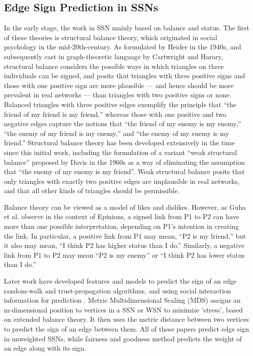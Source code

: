 \documentclass{article}
\begin{document}
\subsection{Edge Sign Prediction in SSNs}
In the early stage, the work in
SSN mainly based on balance and status. The first of these 
theories is structural balance theory, which originated in 
social psychology in the mid-20th-century. As formulated by 
Heider in the 1940s\cite{heider1940}, and subsequently cast 
in graph-theoretic language by Cartwright and 
Harary\cite{Cartwright1956-CARSBA-4}, structural balance 
considers the possible ways in which triangles on three 
individuals can be signed, and posits that triangles with 
three positive signs and those with one positive sign are 
more plausible — and hence should be more prevalent in real 
networks — than triangles with two positive signs or none. 
Balanced triangles with three positive edges exemplify the 
principle that “the friend of my friend is my friend,” whereas 
those with one positive and two negative edges capture the 
notions that “the friend of my enemy is my enemy,” 
“the enemy of my friend is my enemy,” and 
“the enemy of my enemy is my friend.” 
Structural balance theory has been developed extensively 
in the time since this initial work\cite{wasserman1994social}, 
including the formulation of a variant “weak structural balance” 
proposed by Davis in the 1960s \cite{Davis1967}as a way of 
eliminating the assumption that “the enemy of my enemy is my 
friend”. Weak structural balance posits that only triangles 
with exactly two positive edges are implausible in real 
networks, and that all other kinds of triangles should be 
permissible.

Balance theory can be viewed as a model of likes and dislikes. 
However, as Guha et al. observe in the context of 
Epinions\cite{Guha:2004:PTD:988672.988727}, a signed link from 
P1 to P2 can have more than one possible interpretation, 
depending on P1’s intention in creating the link. 
In particular, a positive link from P1 may mean, 
“P2 is my friend,” but it also may mean, “I think P2 has higher 
status than I do.” Similarly, a negative link from P1 to P2 may
 mean “P2 is my enemy” or “I think P2 has lower status than 
 I do.”

Later work have developed features and models to predict the 
sign of an edge random-walk and trust-propagation 
algorithms\cite{Dubois}\cite{Guha:2004:PTD:988672.988727}, 
and using social interaction information for prediction
\cite{Yang2012}\cite{Tang:2016:SSN:2988524.2956185}. Metric 
Multidimensional Scaling (MDS) assigns an m-dimensional 
position to vertices in a SSN or WSN to minimize ‘stress’, 
based on extended balance theory\cite{Qian:2014:FTD:2639948.2628438}. 
It then uses the metric distance between two vertices to 
predict the sign of an edge between them. All of these papers 
predict edge sign in unweighted SSNs, while fairness and 
goodness method predicts the weight of an edge along with its 
sign. 
\end{document}
